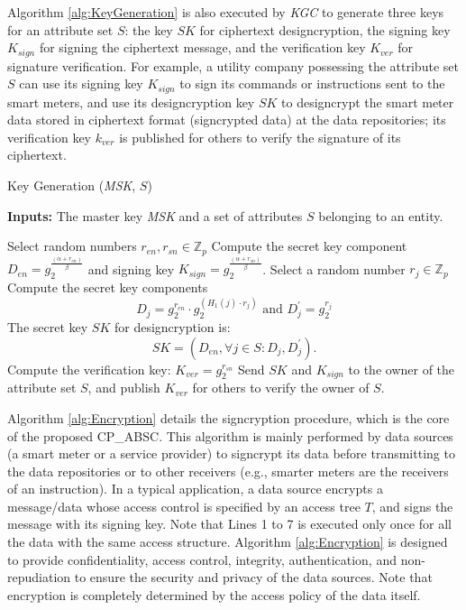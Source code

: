 \documentclass[letterpaper,12pt]{article}
\newenvironment{alginc}[1][pseudocode]{\medskip\algsetlanguage{#1}\begin{algorithmic}[1]}{\end{algorithmic}\medskip}
\begin{document}
Algorithm \ref{alg:KeyGeneration} is also executed by \emph{KGC} to generate three keys for an attribute set $S$: the key $SK$ for ciphertext designcryption, the signing key $K_{sign}$ for signing the ciphertext message, and the verification key $K_{ver}$ for signature verification.
For example, a utility company possessing the attribute set $S$ can use its signing key $K_{sign}$ to sign its commands or instructions sent to the smart meters, and use its designcryption key $SK$ to designcrypt the smart meter data stored in ciphertext format (signcrypted data) at the data repositories; its verification key  $k_{ver}$ is published for others to verify the signature of its ciphertext.


\begin{algorithm}[htp]
\caption{Key Generation (\emph{MSK}, $S$)}\label{alg:KeyGeneration}
\small{\bf Inputs:} The master key \emph{MSK} and a set of attributes $S$ belonging to an entity.
\begin{alginc}
\State Select random numbers $r_{en},r_{sn} \in \mathbb{Z}_p$
\State Compute the secret key component $D_{en}=g_2^{\frac{(\alpha+r_{en})}{\beta}}$ and signing key $K_{sign}=g_2^{\frac{(\alpha+r_{sn})}{\beta}}$.
  \State Select a random number $r_j \in \mathbb{Z}_p$
  \State Compute the secret key components $$D_j=g_2^{r_{en}}\cdot g_2^{(H_1(j)\cdot {r_j})} \mbox{ and } D_j^\prime=g_2^{r_j}$$
\EndFor
\State The secret key $SK$ for designcryption is:
\begin{equation}
 SK= (D_{en}, \forall j \in S: D_j, D_j^\prime).
\end{equation}
\State Compute the verification key:  $K_{ver} = g_2^{r_{sn}}$
\State Send $SK$ and $K_{sign}$ to the owner of the attribute set $S$, and  publish $K_{ver}$ for others to verify the owner of $S$.
\end{alginc}
\end{algorithm}

Algorithm \ref{alg:Encryption} details the signcryption procedure, which is the core of the proposed CP\_ABSC. This algorithm is mainly performed by data sources (a smart meter or a service provider) to signcrypt its data before transmitting to the data repositories or to other receivers (e.g., smarter meters are the receivers of an instruction).  In a typical application, a data source encrypts a message/data whose access control is specified by an access tree $T$, and signs the message with its signing key. Note that Lines 1 to 7 is executed only once for all the data with the same access structure. Algorithm \ref{alg:Encryption} is designed to provide confidentiality, access control, integrity, authentication, and non-repudiation to ensure the security and privacy of the data sources. Note that encryption is completely determined by the access policy of the data itself.
\end{document}
